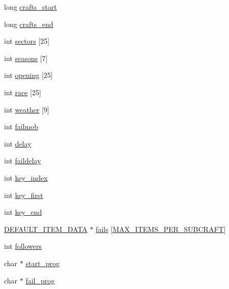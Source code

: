 \begin{DoxyCompactItemize}
\item 
long \hyperlink{structsubcraft__head__data_ab2bb385dfa4befa102ec9d12113a8c2a}{crafts\-\_\-start}
\item 
long \hyperlink{structsubcraft__head__data_a8e663fb7427df5c18ae5342d69a9c372}{crafts\-\_\-end}
\item 
int \hyperlink{structsubcraft__head__data_a8c67496c6d5f2f03bb06196c50c0b102}{sectors} \mbox{[}25\mbox{]}
\item 
int \hyperlink{structsubcraft__head__data_a136a6ced49dd19380d6c096801f6dd33}{seasons} \mbox{[}7\mbox{]}
\item 
int \hyperlink{structsubcraft__head__data_a5bf25f461e22277f260ec970443104fe}{opening} \mbox{[}25\mbox{]}
\item 
int \hyperlink{structsubcraft__head__data_a5976bc6902c4faf452da74285f5a7200}{race} \mbox{[}25\mbox{]}
\item 
int \hyperlink{structsubcraft__head__data_a200cee3cf32033ef96135725305d2a27}{weather} \mbox{[}9\mbox{]}
\item 
int \hyperlink{structsubcraft__head__data_aa037711c47b31b5180c90394edc389b3}{failmob}
\item 
int \hyperlink{structsubcraft__head__data_a0053e7b4de1ce43002a815e314c18681}{delay}
\item 
int \hyperlink{structsubcraft__head__data_a9abefe55f4b6dffc5db1399b6fcb110c}{faildelay}
\item 
int \hyperlink{structsubcraft__head__data_a79e3da8c9e0fa47f013a2bafd3ee83da}{key\-\_\-index}
\item 
int \hyperlink{structsubcraft__head__data_af7f2b958c290a389d56795129da5b4ef}{key\-\_\-first}
\item 
int \hyperlink{structsubcraft__head__data_a5b9db569412fe92ab19b28a91d2a4479}{key\-\_\-end}
\item 
\hyperlink{structs_8h_a0d3564d2558ddecb8307de195707d292}{D\-E\-F\-A\-U\-L\-T\-\_\-\-I\-T\-E\-M\-\_\-\-D\-A\-T\-A} $\ast$ \hyperlink{structsubcraft__head__data_a3ec0b2d53c443fc93064ffd3877c8bbb}{fails} \mbox{[}\hyperlink{structs_8h_aae5dc301d156382191adc8f9abe7b4e0}{M\-A\-X\-\_\-\-I\-T\-E\-M\-S\-\_\-\-P\-E\-R\-\_\-\-S\-U\-B\-C\-R\-A\-F\-T}\mbox{]}
\item 
int \hyperlink{structsubcraft__head__data_adc6e3156783ca4c4e6b01b3cec6c3e22}{followers}
\item 
char $\ast$ \hyperlink{structsubcraft__head__data_a1ce764d4d0b2cac40d916d44407cb3c7}{start\-\_\-prog}
\item 
char $\ast$ \hyperlink{structsubcraft__head__data_a578d5c064bc0bb1f501ae156dc9767e3}{fail\-\_\-prog}

\end{DoxyCompactItemize}
